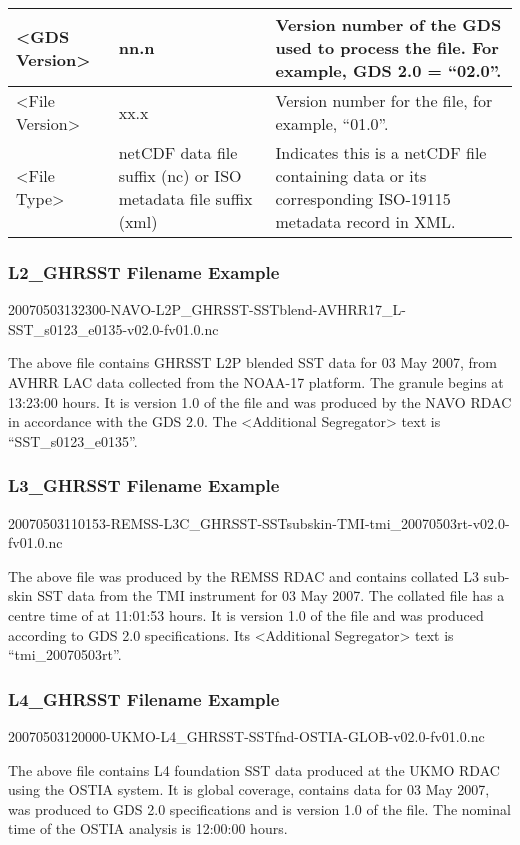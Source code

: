 \begin{longtable}{|p{}|p{}|p{}|}
<GDS Version> & nn.n & Version number of the GDS used to process the file. For example, GDS 2.0 = “02.0”. \\ \hline
<File Version> & xx.x & Version number for the file, for example, “01.0”. \\ \hline

<File Type> & netCDF data file suffix (nc) or ISO metadata file suffix (xml) & 
Indicates this is a netCDF file containing data or its corresponding ISO-19115 metadata record in XML.\\ \hline

\end{longtable}

\subsubsection{L2\_GHRSST Filename Example}
20070503132300-NAVO-L2P\_GHRSST-SSTblend-AVHRR17\_L-SST\_s0123\_e0135-v02.0-fv01.0.nc \par
The above file contains GHRSST L2P blended SST data for 03 May 2007, from AVHRR LAC data
collected from the NOAA-17 platform. The granule begins at 13:23:00 hours. It is version 1.0 of the
file and was produced by the NAVO RDAC in accordance with the GDS 2.0. The <Additional
Segregator> text is “SST\_s0123\_e0135”. \par

\subsubsection{L3\_GHRSST Filename Example}
20070503110153-REMSS-L3C\_GHRSST-SSTsubskin-TMI-tmi\_20070503rt-v02.0-fv01.0.nc \par
The above file was produced by the REMSS RDAC and contains collated L3 sub-skin SST data from
the TMI instrument for 03 May 2007. The collated file has a centre time of at 11:01:53 hours. It is
version 1.0 of the file and was produced according to GDS 2.0 specifications. Its <Additional
Segregator> text is “tmi\_20070503rt”. \par

\subsubsection{L4\_GHRSST Filename Example}
20070503120000-UKMO-L4\_GHRSST-SSTfnd-OSTIA-GLOB-v02.0-fv01.0.nc \par
The above file contains L4 foundation SST data produced at the UKMO RDAC using the OSTIA
system. It is global coverage, contains data for 03 May 2007, was produced to GDS 2.0 specifications
and is version 1.0 of the file. The nominal time of the OSTIA analysis is 12:00:00 hours. \par


